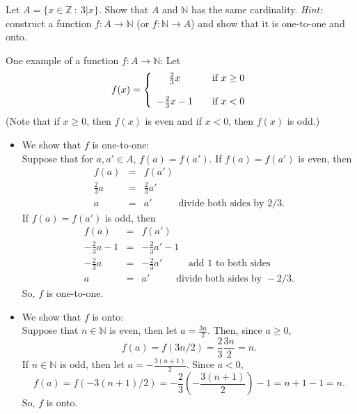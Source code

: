 \documentclass{article}
\newcommand{\Z}{\mathbb{Z}}
\newcommand{\N}{\mathbb{N}}
\theoremstyle{definition}
\begin{document}
\begin{question}
    Let $A = \{ x \in \Z ~:~ 3|x \}$.  Show that $A$ and $\mathbb{N}$ has the same cardinality.  {\it Hint:} construct a function $f: A \rightarrow \mathbb{N}$ (or $f: \mathbb{N} \rightarrow A$) and show that it is one-to-one and onto.
\end{question}
\begin{solution}
One example of a function $f: A \rightarrow \N$: Let
\[ f(x) =\left\{\begin{array}{c c l} \frac{2}{3}x & & \text{if } x \geq 0 \\ ~ \\ -\frac{2}{3}x - 1 &  & \text{if } x < 0 \end{array} \right. \]
(Note that if $x \geq 0$, then $f(x)$ is even and if $x < 0$, then $f(x)$ is odd.)

\begin{itemize}
\item We show that $f$ is one-to-one:\\
Suppose that for $a, a' \in A$, $f(a) = f(a')$.  If $f(a) = f(a')$ is even, then
\begin{eqnarray*}
f(a) & = & f(a') \\
\frac{2}{3} a & = & \frac{2}{3} a' \\
a & = & a' \hspace{1cm} \text{ divide both sides by } 2/3.
\end{eqnarray*}
If $f(a) = f(a')$ is odd, then
\begin{eqnarray*}
f(a) & = & f(a') \\
-\frac{2}{3} a - 1 & = & -\frac{2}{3} a' - 1 \\
-\frac{2}{3} a & = & -\frac{2}{3} a'\hspace{1cm} \text{ add 1 to both sides }\\
a & = & a' \hspace{1cm} \text{ divide both sides by } -2/3.
\end{eqnarray*}
So, $f$ is one-to-one.
\item We show that $f$ is onto:\\
Suppose that $n \in \N$ is even, then let $a = \frac{3n}{2}$.  Then, since $a \geq 0$, 
\[ f(a) = f(3n/2) = \frac{2}{3} \frac{3n}{2} = n. \]
If $n \in \N$ is odd, then let $a = -\frac{3(n+1)}{2}$.  Since $a < 0$,
\[ f(a) = f(-3(n+1)/2) = -\frac{2}{3}\left(-\frac{3(n+1)}{2}\right) - 1 =  n+1 - 1 = n.\]
So, $f$ is onto.

\end{itemize}
\end{solution}
\end{document}
